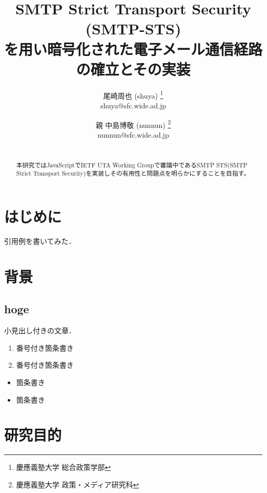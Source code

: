 \documentclass[a4j,10pt]{jsarticle}
\begin{document}

\title{SMTP Strict Transport Security (SMTP-STS)
\\を用い暗号化された電子メール通信経路の確立とその実装}

\author{
    尾崎周也 (shuya) \thanks{慶應義塾大学 総合政策学部}
    \\shuya@sfc.wide.ad.jp
    \and
    親 中島博敬 (nunnun) \thanks{慶應義塾大学 政策・メディア研究科}
    \\nunnun@sfc.wide.ad.jp
}


\begin{abstract}
\\本研究ではJavaScriptでIETF UTA Working Groupで審議中であるSMTP STS(SMTP Strict Transport Security)を実装しその有用性と問題点を明らかにすることを目指す。\end{abstract}

\maketitle
\thispagestyle{empty}

\section{はじめに}

引用例\cite{example}を書いてみた．

\section{背景}

\subsection{hoge}
小見出し付きの文章．

\begin{enumerate}
\item 番号付き箇条書き 
\item 番号付き箇条書き
\end{enumerate}

\begin{itemize}
\item 箇条書き
\item 箇条書き
\end{itemize}


\section{研究目的}
\end{document}
